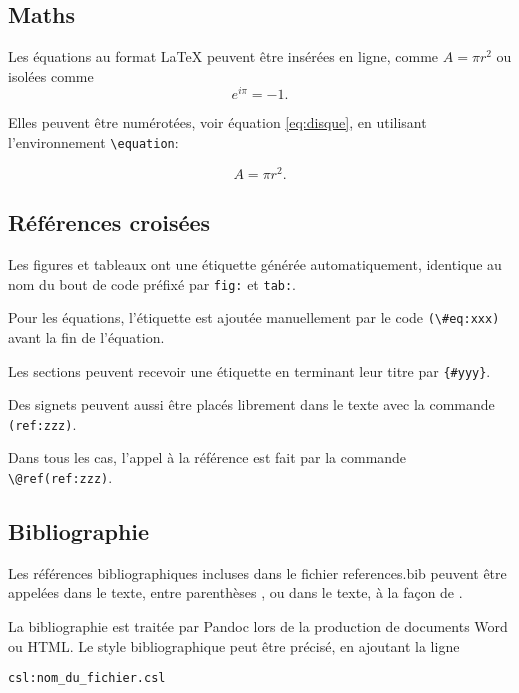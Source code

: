\documentclass[fleqn,10pt]{latex/stylish_article} %
\begin{document}
\hypertarget{maths}{%
\subsection{Maths}\label{maths}}

Les équations au format LaTeX peuvent être insérées en ligne, comme \(A=\pi r^2\) ou isolées comme \[e^{i \pi} = -1.\]

Elles peuvent être numérotées, voir équation \eqref{eq:disque}, en utilisant l'environnement \texttt{\textbackslash{}equation}:

\begin{equation}
A = \pi r^2.
\label{eq:disque}
\end{equation}

\hypertarget{ruxe9fuxe9rences-croisuxe9es}{%
\subsection{Références croisées}\label{ruxe9fuxe9rences-croisuxe9es}}

Les figures et tableaux ont une étiquette générée automatiquement, identique au nom du bout de code préfixé par \texttt{fig:} et \texttt{tab:}.

Pour les équations, l'étiquette est ajoutée manuellement par le code \texttt{(\textbackslash{}\#eq:xxx)} avant la fin de l'équation.

Les sections peuvent recevoir une étiquette en terminant leur titre par \texttt{\{\#yyy\}}.

Des signets peuvent aussi être placés librement dans le texte avec la commande \texttt{(ref:zzz)}.

Dans tous les cas, l'appel à la référence est fait par la commande \texttt{\textbackslash{}@ref(ref:zzz)}.

\hypertarget{bibliographie}{%
\subsection{Bibliographie}\label{bibliographie}}

Les références bibliographiques incluses dans le fichier references.bib peuvent être appelées dans le texte, entre parenthèses \citep{Xie2016}, ou dans le texte, à la façon de \citet{Xie2016}.

La bibliographie est traitée par Pandoc lors de la production de documents Word ou HTML.
Le style bibliographique peut être précisé, en ajoutant la ligne

\begin{verbatim}
csl:nom_du_fichier.csl
\end{verbatim}
\end{document}
